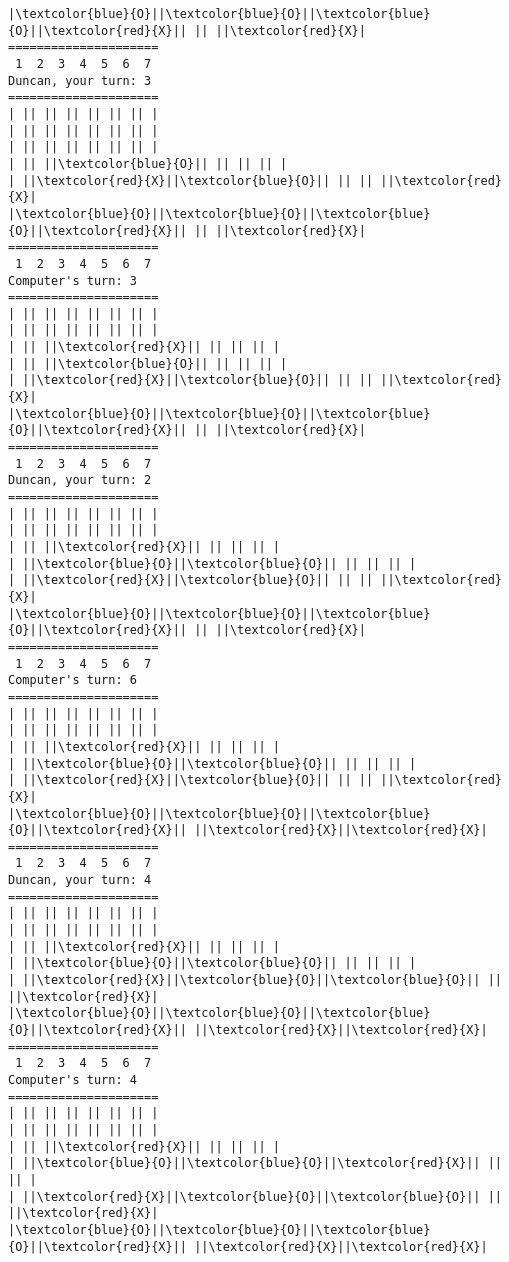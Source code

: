 \documentclass{article}
\begin{document}
\begin{Verbatim}[commandchars=\\\{\}]
|\textcolor{blue}{O}||\textcolor{blue}{O}||\textcolor{blue}{O}||\textcolor{red}{X}|| || ||\textcolor{red}{X}|
=====================
 1  2  3  4  5  6  7
Duncan, your turn: 3
=====================
| || || || || || || |
| || || || || || || |
| || || || || || || |
| || ||\textcolor{blue}{O}|| || || || |
| ||\textcolor{red}{X}||\textcolor{blue}{O}|| || || ||\textcolor{red}{X}|
|\textcolor{blue}{O}||\textcolor{blue}{O}||\textcolor{blue}{O}||\textcolor{red}{X}|| || ||\textcolor{red}{X}|
=====================
 1  2  3  4  5  6  7
Computer's turn: 3
=====================
| || || || || || || |
| || || || || || || |
| || ||\textcolor{red}{X}|| || || || |
| || ||\textcolor{blue}{O}|| || || || |
| ||\textcolor{red}{X}||\textcolor{blue}{O}|| || || ||\textcolor{red}{X}|
|\textcolor{blue}{O}||\textcolor{blue}{O}||\textcolor{blue}{O}||\textcolor{red}{X}|| || ||\textcolor{red}{X}|
=====================
 1  2  3  4  5  6  7
Duncan, your turn: 2
=====================
| || || || || || || |
| || || || || || || |
| || ||\textcolor{red}{X}|| || || || |
| ||\textcolor{blue}{O}||\textcolor{blue}{O}|| || || || |
| ||\textcolor{red}{X}||\textcolor{blue}{O}|| || || ||\textcolor{red}{X}|
|\textcolor{blue}{O}||\textcolor{blue}{O}||\textcolor{blue}{O}||\textcolor{red}{X}|| || ||\textcolor{red}{X}|
=====================
 1  2  3  4  5  6  7
Computer's turn: 6
=====================
| || || || || || || |
| || || || || || || |
| || ||\textcolor{red}{X}|| || || || |
| ||\textcolor{blue}{O}||\textcolor{blue}{O}|| || || || |
| ||\textcolor{red}{X}||\textcolor{blue}{O}|| || || ||\textcolor{red}{X}|
|\textcolor{blue}{O}||\textcolor{blue}{O}||\textcolor{blue}{O}||\textcolor{red}{X}|| ||\textcolor{red}{X}||\textcolor{red}{X}|
=====================
 1  2  3  4  5  6  7
Duncan, your turn: 4
=====================
| || || || || || || |
| || || || || || || |
| || ||\textcolor{red}{X}|| || || || |
| ||\textcolor{blue}{O}||\textcolor{blue}{O}|| || || || |
| ||\textcolor{red}{X}||\textcolor{blue}{O}||\textcolor{blue}{O}|| || ||\textcolor{red}{X}|
|\textcolor{blue}{O}||\textcolor{blue}{O}||\textcolor{blue}{O}||\textcolor{red}{X}|| ||\textcolor{red}{X}||\textcolor{red}{X}|
=====================
 1  2  3  4  5  6  7
Computer's turn: 4
=====================
| || || || || || || |
| || || || || || || |
| || ||\textcolor{red}{X}|| || || || |
| ||\textcolor{blue}{O}||\textcolor{blue}{O}||\textcolor{red}{X}|| || || |
| ||\textcolor{red}{X}||\textcolor{blue}{O}||\textcolor{blue}{O}|| || ||\textcolor{red}{X}|
|\textcolor{blue}{O}||\textcolor{blue}{O}||\textcolor{blue}{O}||\textcolor{red}{X}|| ||\textcolor{red}{X}||\textcolor{red}{X}|

\end{Verbatim}
\end{document}
